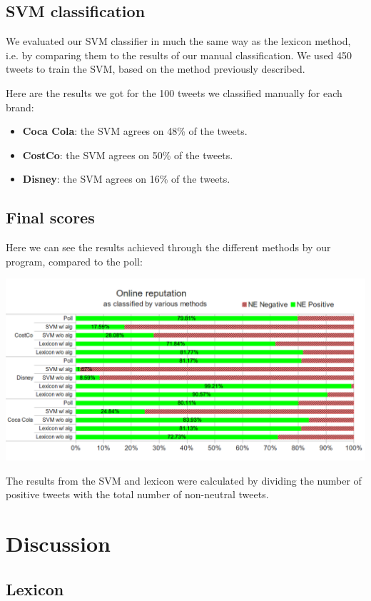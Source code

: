\documentclass[a4paper,12pt]{report}
\begin{document}
\section{SVM classification}

We evaluated our SVM classifier in much the same way as the lexicon method, i.e. by comparing them to the results of our manual classification.
We used 450 tweets to train the SVM, based on the method previously described.

Here are the results we got for the 100 tweets we classified manually for each brand:
\begin{itemize}
        \item \textbf{Coca Cola}: the SVM agrees on 48\% of the tweets.
        \item \textbf{CostCo}: the SVM agrees on 50\% of the tweets.
        \item \textbf{Disney}: the SVM agrees on 16\% of the tweets.
\end{itemize}

\section{Final scores}
Here we can see the results achieved through the different methods by our program, compared to the poll:


\centerline{\includegraphics[scale=0.55]{../img/full1.png}}


The results from the SVM and lexicon were calculated by dividing the number of positive tweets with the total number of non-neutral tweets.

\chapter{Discussion}

\section{Lexicon}
\end{document}
